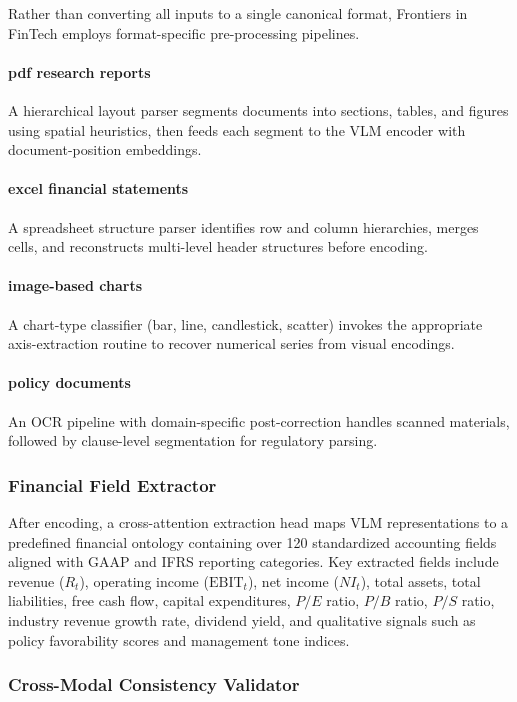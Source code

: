 \documentclass[12pt,letterpaper]{article}
\begin{document}
Rather than converting all inputs to a single canonical format,
Frontiers in FinTech employs format-specific pre-processing pipelines.

\paragraph{pdf research reports}
A hierarchical layout parser segments documents into sections, tables,
and figures using spatial heuristics, then feeds each segment to the
VLM encoder with document-position embeddings.

\paragraph{excel financial statements}
A spreadsheet structure parser identifies row and column hierarchies,
merges cells, and reconstructs multi-level header structures before
encoding.

\paragraph{image-based charts}
A chart-type classifier (bar, line, candlestick, scatter) invokes the
appropriate axis-extraction routine to recover numerical series from
visual encodings.

\paragraph{policy documents}
An OCR pipeline with domain-specific post-correction handles scanned
materials, followed by clause-level segmentation for regulatory parsing.

\subsubsection{Financial Field Extractor}

After encoding, a cross-attention extraction head maps VLM
representations to a predefined financial ontology containing over
120 standardized accounting fields aligned with GAAP and IFRS reporting
categories.
Key extracted fields include revenue ($R_t$), operating income ($\text{EBIT}_t$),
net income ($NI_t$), total assets, total liabilities, free cash flow,
capital expenditures, $P/E$ ratio, $P/B$ ratio, $P/S$ ratio, industry
revenue growth rate, dividend yield, and qualitative signals such as
policy favorability scores and management tone indices.

\subsubsection{Cross-Modal Consistency Validator}
\end{document}

